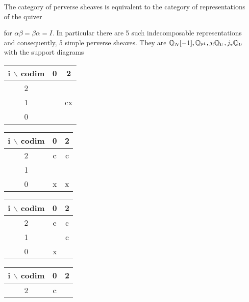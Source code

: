 \begin{example}
    The category of perverse sheaves is equivalent to the category of representations 
    of the quiver \begin{center}
    \end{center} for $\alpha\beta = \beta\alpha = I$.
    In particular there are 5 such indecomposable representations and consequently,
    5 simple perverse sheaves. They are 
    $\mathbb{Q}_N[-1],\mathbb{Q}_{\mathbb{P}^1},j_!\mathbb{Q}_U, j_*\mathbb{Q}_U$ with the support diagrams
    \begin{center}
        \begin{tabular}{|c|c|c|}
            \hline
            i $\backslash$ codim & 0 & 2\\
            \hline
            2 &  &  \\
            \hline
            1 &  & cx \\
            \hline
            0 &  & \\
            \hline
        \end{tabular}
        \begin{tabular}{|c|c|c|}
            \hline
            i $\backslash$ codim & 0 & 2\\
            \hline
            2 & c & c \\
            \hline
            1 &  &  \\
            \hline
            0 & x & x\\
            \hline
        \end{tabular}
        \begin{tabular}{|c|c|c|}
            \hline
            i $\backslash$ codim & 0 & 2\\
            \hline
            2 &c  & c \\
            \hline
            1 &  &  c\\
            \hline
            0 & x & \\
            \hline
        \end{tabular}
        \begin{tabular}{|c|c|c|}
            \hline
            i $\backslash$ codim & 0 & 2\\
            \hline
            2 &  c&  \\

\end{tabular}
\end{center}
\end{example}
